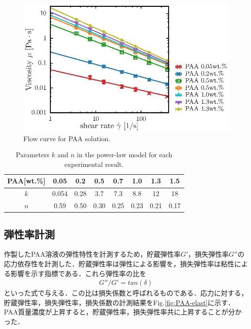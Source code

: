 \begin{figure}[ht]
	\centering
	\includegraphics[width=13cm,clip]{4-Results/viscosity.eps}
	\caption{Flow curve for PAA solution.}
	\label{fig:PAA-vis}
\end{figure}

\begin{table}[h]
	\centering
	\caption{Parameters $k$ and $n$ in the power-law model for each experimental result.}
	\label{table:power-law}
	\begin{tabular}{c|c|c|c|c|c|c|c} \hline
		PAA[wt.\%] & 0.05  & 0.2  & 0.5  & 0.7  & 1.0  & 1.3  & 1.5  \\ \hline \hline
		$k$        & 0.054 & 0.28 & 3.7  & 7.3  & 8.8  & 12   & 18   \\
		$n$        & 0.59  & 0.50 & 0.30 & 0.25 & 0.23 & 0.21 & 0.17 \\ \hline
	\end{tabular}
\end{table}

\newpage

\subsection{弾性率計測}

作製したPAA溶液の弾性特性を計測するため，貯蔵弾性率$G'$，損失弾性率$G''$の応力依存性を計測した．貯蔵弾性率は弾性による影響を，損失弾性率は粘性による影響を示す指標である．これら弾性率の比を
\begin{eqnarray}
	\label{eq:}
G''/G'=tan\left(\delta\right)
\end{eqnarray}
といった式で与える．この比は損失係数と呼ばれるものである．応力に対する，貯蔵弾性率，損失弾性率，損失係数の計測結果をFig.\ref{fig:PAA-elast}に示す．PAA質量濃度が上昇すると，貯蔵弾性率，損失弾性率共に上昇することが分かった．

